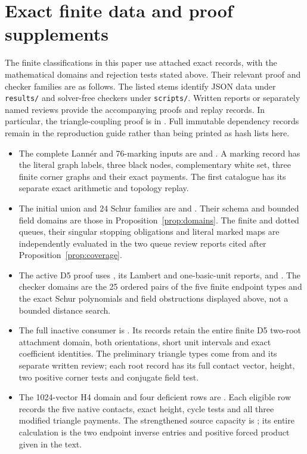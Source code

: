 \documentclass[11pt]{article}
\begin{document}
\section{Exact finite data and proof supplements}
The finite classifications in this paper use attached exact records,
with the mathematical domains and rejection tests stated above.
Their relevant proof and checker families are as follows. The listed
stems identify JSON data under \texttt{results/} and solver-free checkers
under \texttt{scripts/}. Written reports or separately named reviews
provide the accompanying proofs and replay records. In particular,
the triangle-coupling proof is in
.
Full immutable dependency records remain in
the reproduction guide rather than being printed as hash lists here.
\begin{itemize}
\item The complete Lann\'er and 76-marking inputs are
 and
. A marking record has
the literal graph labels, three black nodes, complementary white set,
three finite corner graphs and their exact payments. The first
catalogue has its separate exact arithmetic and topology replay.
\item The initial union and 24 Schur families are
 and
. Their schema and
bounded field domains are those in Proposition~\ref{prop:domains}.
The finite and dotted queues, their singular stopping obligations and
literal marked maps are independently evaluated in the two queue
review reports cited after Proposition~\ref{prop:coverage}.
\item The active D5 proof uses
,
its Lambert and one-basic-unit reports, and
.
The checker domains are the 25 ordered pairs of the five finite
endpoint types and the exact Schur polynomials and field obstructions
displayed above, not a bounded distance search.
\item The full inactive consumer is
.
Its records retain the entire finite D5 two-root attachment domain,
both orientations, short unit intervals and exact coefficient identities.
The preliminary triangle types come from
 and its
separate written review; each root record has its full contact vector,
height, two positive corner tests and conjugate field test.
\item The 1024-vector H4 domain and four deficient rows are
.
Each eligible row records the five native contacts, exact height,
cycle tests and all three modified triangle payments. The strengthened
source capacity is
; its entire
calculation is the two endpoint inverse entries and positive forced
product given in the text.
\end{itemize}
\end{document}
